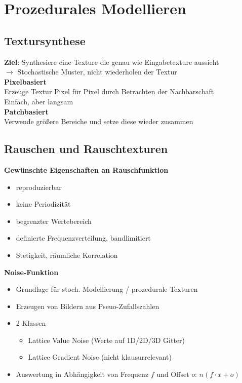 \section{Prozedurales Modellieren}%
\label{pm:sec:prozedurales_modellieren}

\subsection{Textursynthese}%
\label{pm:sub:textursynthese}

\textbf{Ziel}: Synthesiere eine Texture die genau wie Eingabetexture aussieht\\
$\rightarrow$ Stochastische Muster, nicht wiederholen der Textur\\

\textbf{Pixelbasiert}\\
Erzeuge Textur Pixel für Pixel durch Betrachten der Nachbarschaft\\
Einfach, aber langsam\\

\textbf{Patchbasiert}\\
Verwende größere Bereiche und setze diese wieder zusammen

\subsection{Rauschen und Rauschtexturen}%
\label{pm:sub:rauschen_und_rauschtexturen}

\textbf{Gewünschte Eigenschaften an Rauschfunktion}
\begin{itemize}
\item reproduzierbar
\item keine Periodizität
\item begrenzter Wertebereich
\item definierte Frequenzverteilung, bandlimitiert
\item Stetigkeit, räumliche Korrelation
\end{itemize}

\textbf{Noise-Funktion}
\begin{itemize}
	\item Grundlage für stoch. Modellierung / prozedurale Texturen
	\item Erzeugen von Bildern aus Pseuo-Zufallszahlen
	\item 2 Klassen
        \begin{itemize}
          \item Lattice Value Noise (Werte auf 1D/2D/3D Gitter)
          \item Lattice Gradient Noise (nicht klausurrelevant)
        \end{itemize}
    \item Auswertung in Abhängigkeit von Frequenz $f$ und Offset $o$: $n(f \cdot x + o)$
\end{itemize}

